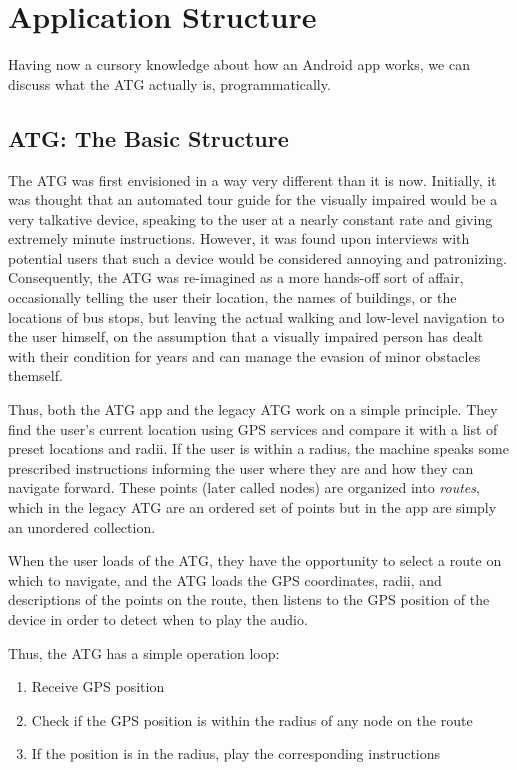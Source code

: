\section{Application Structure}

Having now a cursory knowledge about how an Android app works, we can discuss what the ATG actually is, programmatically.
\subsection{ATG: The Basic Structure}
The ATG was first envisioned in a way very different than it is now. Initially, it was thought that an automated tour guide for the visually
impaired would be a very talkative device, speaking to the user at a nearly constant rate and giving extremely minute instructions. However,
it was found upon interviews with potential users that such a device would be considered annoying and patronizing. Consequently, the ATG was
re-imagined as a more hands-off sort of affair, occasionally telling the user their location, the names of buildings, or the locations of
bus stops, but leaving the actual walking and low-level navigation to the user himself, on the assumption that a visually impaired person has
dealt with their condition for years and can manage the evasion of minor obstacles themself.

Thus, both the ATG app and the legacy ATG work on a simple principle. They find the user's current location using GPS services and compare it
with a list of preset locations and radii. If the user is within a radius, the machine speaks some prescribed instructions informing
the user where they are and how they can navigate forward. These points (later called nodes) are organized into \emph{routes}, which in the 
legacy ATG are an ordered set of points but in the app are simply an unordered collection. 

When the user loads of the ATG, they have the opportunity to select a route on which to navigate, and the ATG loads the GPS coordinates, 
radii, and descriptions of the points on the route, then listens to the GPS position of the device in order to detect when to play the audio.

Thus, the ATG has a simple operation loop:

\begin{enumerate}
\item{Receive GPS position}
\item{Check if the GPS position is within the radius of any node on the route}
\item{If the position is in the radius, play the corresponding instructions}
\end{enumerate}
